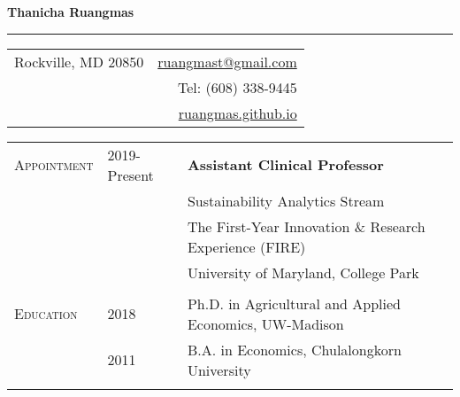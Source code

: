 \documentclass[letterpaper,11pt,oneside]{article}\usepackage[]{graphicx}\usepackage[]{xcolor}
\newcommand{\link}[1]{{\color{blue}\href{#1}{#1}}}
\begin{document}

\noindent  \LARGE{\textbf{Thanicha Ruangmas}}  \\
\noindent\rule{\textwidth}{1pt}
\normalsize 

\vspace{1em}
\noindent \begin{tabular}{p{2.1in} r}
Rockville, MD 20850         & \hspace{3.5in} \link{ruangmast@gmail.com} \\
                      & \hspace{3.5in} Tel: (608) 338-9445 \\
                       & \hspace{3.5in} \link{ruangmas.github.io} \\
\end{tabular}

\vspace{2em}


\noindent \begin{tabular}{p{1.2in} p{0.9in} l}

\textsc{Appointment}    & 2019-Present & \textbf{Assistant Clinical Professor} \\
                        &       & Sustainability Analytics Stream \\
                        &       & The First-Year Innovation \& Research Experience (FIRE) \\
                        &       & University of Maryland, College Park \\
                        &       &  \\                        
\textsc{Education}      & 2018 & Ph.D. in Agricultural and Applied Economics, UW-Madison \\
                        & 2011 & B.A. in Economics, Chulalongkorn University \\
                        &       &  \\  
\end{tabular}
\end{document}
